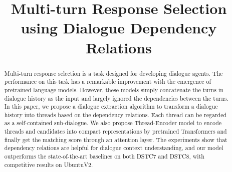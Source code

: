 \documentclass{article}
\title{Multi-turn Response Selection using Dialogue Dependency Relations}
\begin{document}
\maketitle

\begin{abstract}
Multi-turn response selection is a task designed for developing dialogue agents. The performance on this task has a remarkable improvement with the emergence of pretrained language models. However, these models simply concatenate the turns in dialogue history as the input and largely ignored the dependencies between the turns. In this paper,  we propose a dialogue extraction algorithm to transform a dialogue history into threads based on the dependency relations. Each thread can be regarded as a self-contained sub-dialogue. We also propose Thread-Encoder model to encode threads and candidates into compact
representations by pretrained Transformers and finally get the matching score through an attention layer. The experiments show that dependency relations are helpful for dialogue context understanding, and our model outperforms the state-of-the-art baselines on both DSTC7 and DSTC8, with competitive results on UbuntuV2.
\end{abstract}




















\end{document}
